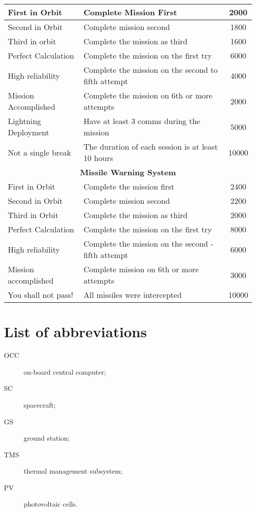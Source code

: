 \documentclass[12pt,a4paper]{article}
\begin{document}
\begin{center}
\begin{longtable}{ |p{5cm}|p{8cm}|c|}
   \hline
   First in Orbit & Complete Mission First & 2000\\
   \hline
   Second in Orbit & Complete mission second & 1800\\
   \hline
   Third in orbit & Complete the mission as third & 1600\\
   \hline
   Perfect Calculation & Complete the mission on the first try & 6000\\
   \hline
   High reliability & Complete the mission on the second to fifth attempt & 4000\\
   \hline
   Mission Accomplished & Complete the mission on 6th or more attempts & 2000\\
   \hline
   Lightning Deployment & Have at least 3 comms during the mission & 5000\\
   \hline
   Not a single break & The duration of each session is at least 10 hours & 10000\\
   \hline
   \multicolumn{3}{|c|}{\textbf{Missile Warning System}}\\
   \hline
   First in Orbit & Complete the mission first & 2400\\
   \hline
   Second in Orbit & Complete mission second & 2200\\
   \hline
   Third in Orbit & Complete the mission as third & 2000\\
   \hline
   Perfect Calculation & Complete the mission on the first try & 8000\\
   \hline
   High reliability & Complete the mission on the second - fifth attempt & 6000\\
   \hline
   Mission accomplished & Complete mission on 6th or more attempts & 3000\\
   \hline
   You shall not pass! & All missiles were intercepted & 10000\\
  \hline
\end{longtable}
\end{center}

\section*{List of abbreviations}

\begin{description}
\item[OCC] on-board central computer;
\item[SC] spacecraft;
\item[GS] ground station;
\item[TMS] thermal management subsystem;
\item[PV] photovoltaic cells.
\end{description}
\end{document}
